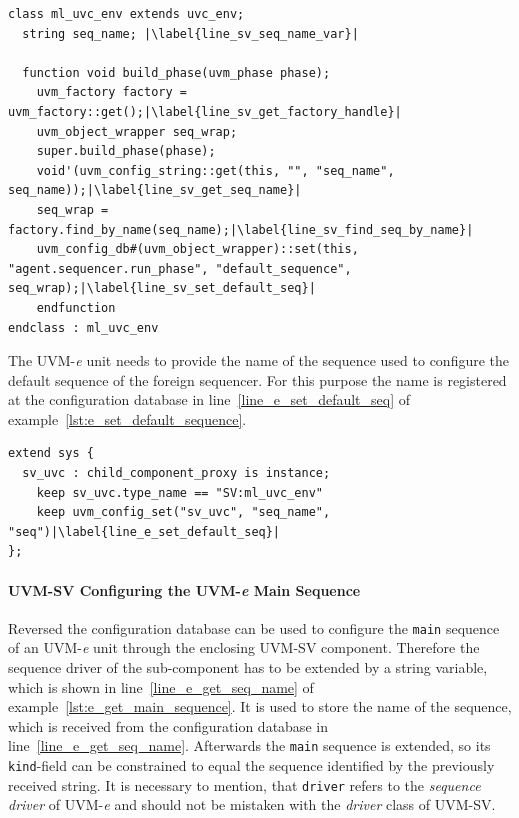 \lstset{language=SystemVerilog, numbers = left, escapechar=|, breaklines=true}
\begin{lstlisting}[frame=htrbl, caption={SystemVerilog: getting the default sequence from configuration database},
label={lst:SV_get_default_sequence}]
class ml_uvc_env extends uvc_env;
  string seq_name; |\label{line_sv_seq_name_var}|
  
  function void build_phase(uvm_phase phase);
    uvm_factory factory = uvm_factory::get();|\label{line_sv_get_factory_handle}|
    uvm_object_wrapper seq_wrap;
    super.build_phase(phase);
    void'(uvm_config_string::get(this, "", "seq_name", seq_name));|\label{line_sv_get_seq_name}|
    seq_wrap = factory.find_by_name(seq_name);|\label{line_sv_find_seq_by_name}|
    uvm_config_db#(uvm_object_wrapper)::set(this, "agent.sequencer.run_phase", "default_sequence", seq_wrap);|\label{line_sv_set_default_seq}|
    endfunction
endclass : ml_uvc_env
\end{lstlisting}
The UVM-\textit{e} unit needs to provide the name of the sequence used to configure the default sequence of the foreign sequencer. For this purpose the name is registered at the configuration database in line~\ref{line_e_set_default_seq} of example~\ref{lst:e_set_default_sequence}.
\lstset{language=e, numbers = left, escapechar=|, breaklines=true}
\begin{lstlisting}[frame=htrbl, caption={\textit{e}: setting the default sequence via configuration database},
label={lst:e_set_default_sequence}]
extend sys {
  sv_uvc : child_component_proxy is instance;
    keep sv_uvc.type_name == "SV:ml_uvc_env"
    keep uvm_config_set("sv_uvc", "seq_name", "seq")|\label{line_e_set_default_seq}|
};
\end{lstlisting}
\paragraph{UVM-SV Configuring the UVM-\textit{e} Main Sequence}
Reversed the configuration database can be used to configure the \lstinline$main$ sequence of an UVM-\textit{e} unit through the enclosing UVM-SV component. Therefore the sequence driver of the sub-component has to be extended by a string variable, which is shown in line~\ref{line_e_get_seq_name} of example~\ref{lst:e_get_main_sequence}. It is used to store the name of the sequence, which is received from the configuration database in line~\ref{line_e_get_seq_name}. Afterwards the \lstinline$main$ sequence is extended, so its \lstinline$kind$-field can be constrained to equal the sequence identified by the previously received string. It is necessary to mention, that \lstinline$driver$ refers to the \emph{sequence driver} of UVM-\textit{e} and should not be mistaken with the \emph{driver} class of UVM-SV. 

